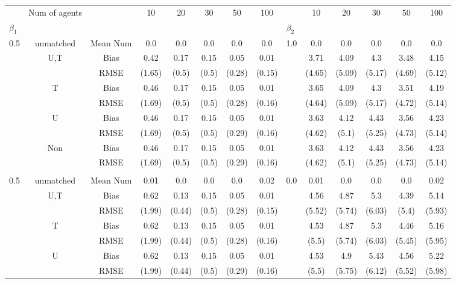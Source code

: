 \begin{tabular}{@{\extracolsep{5pt}}lc|cccccc|lccccc}
\toprule 
 & Num of agents &  & 10 & 20 & 30 & 50 & 100 &  & 10 & 20 & 30 & 50 & 100 \\
$\beta_1$ &  &  &  &  &  &  &  & $\beta_2$ &  &  &  &  &  \\
\midrule 
0.5 & unmatched & Mean Num & 0.0 & 0.0 & 0.0 & 0.0 & 0.0 & 1.0 & 0.0 & 0.0 & 0.0 & 0.0 & 0.0 \\
 & U,T & Bias & 0.42 & 0.17 & 0.15 & 0.05 & 0.01 &  & 3.71 & 4.09 & 4.3 & 3.48 & 4.15 \\
 &  & RMSE & (1.65) & (0.5) & (0.5) & (0.28) & (0.15) &  & (4.65) & (5.09) & (5.17) & (4.69) & (5.12) \\
 & T & Bias & 0.46 & 0.17 & 0.15 & 0.05 & 0.01 &  & 3.65 & 4.09 & 4.3 & 3.51 & 4.19 \\
 &  & RMSE & (1.69) & (0.5) & (0.5) & (0.28) & (0.16) &  & (4.64) & (5.09) & (5.17) & (4.72) & (5.14) \\
 & U & Bias & 0.46 & 0.17 & 0.15 & 0.05 & 0.01 &  & 3.63 & 4.12 & 4.43 & 3.56 & 4.23 \\
 &  & RMSE & (1.69) & (0.5) & (0.5) & (0.29) & (0.16) &  & (4.62) & (5.1) & (5.25) & (4.73) & (5.14) \\
 & Non & Bias & 0.46 & 0.17 & 0.15 & 0.05 & 0.01 &  & 3.63 & 4.12 & 4.43 & 3.56 & 4.23 \\
 &  & RMSE & (1.69) & (0.5) & (0.5) & (0.29) & (0.16) &  & (4.62) & (5.1) & (5.25) & (4.73) & (5.14) \\
 &  &  &  &  &  &  &  &  &  &  &  &  &  \\
0.5 & unmatched & Mean Num & 0.01 & 0.0 & 0.0 & 0.0 & 0.02 & 0.0 & 0.01 & 0.0 & 0.0 & 0.0 & 0.02 \\
 & U,T & Bias & 0.62 & 0.13 & 0.15 & 0.05 & 0.01 &  & 4.56 & 4.87 & 5.3 & 4.39 & 5.14 \\
 &  & RMSE & (1.99) & (0.44) & (0.5) & (0.28) & (0.15) &  & (5.52) & (5.74) & (6.03) & (5.4) & (5.93) \\
 & T & Bias & 0.62 & 0.13 & 0.15 & 0.05 & 0.01 &  & 4.53 & 4.87 & 5.3 & 4.46 & 5.16 \\
 &  & RMSE & (1.99) & (0.44) & (0.5) & (0.28) & (0.16) &  & (5.5) & (5.74) & (6.03) & (5.45) & (5.95) \\
 & U & Bias & 0.62 & 0.13 & 0.15 & 0.05 & 0.01 &  & 4.53 & 4.9 & 5.43 & 4.56 & 5.22 \\
 &  & RMSE & (1.99) & (0.44) & (0.5) & (0.29) & (0.16) &  & (5.5) & (5.75) & (6.12) & (5.52) & (5.98) \\

\end{tabular}
